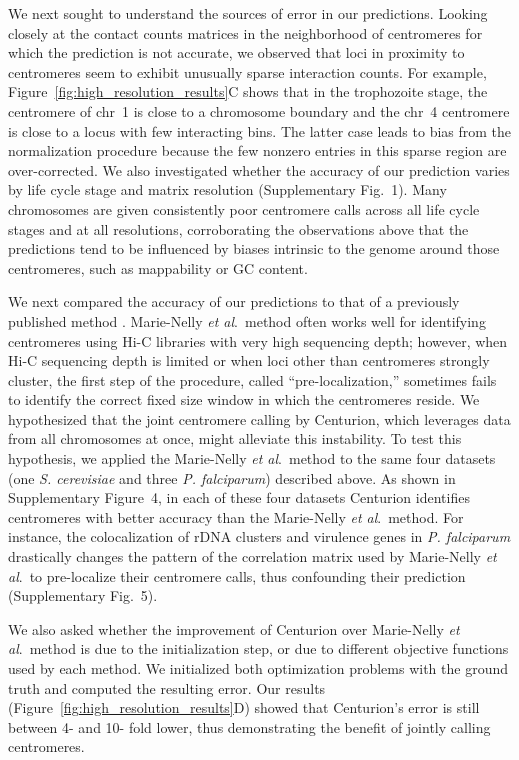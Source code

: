 We next sought to understand the sources of error in our predictions. Looking
closely at the contact counts matrices in the neighborhood of centromeres for
which the prediction is not accurate, we observed that loci in proximity to
centromeres seem to exhibit unusually sparse interaction counts. For example,
Figure~\ref{fig:high_resolution_results}C shows that in the trophozoite stage,
the centromere of chr~1 is close to a chromosome boundary and the chr~4
centromere is close to a locus with few interacting bins. The latter case
leads to bias from the normalization procedure because the few nonzero entries
in this sparse region are over-corrected. We also investigated whether the
accuracy of our prediction varies by life cycle stage and matrix resolution
(Supplementary Fig.~1). Many chromosomes are given
consistently poor centromere calls across all life cycle stages and at all
resolutions, corroborating the observations above that the predictions tend to
be influenced by biases intrinsic to the genome around those centromeres, such
as mappability or GC content.

We next compared the accuracy of our predictions to that of a previously
published method \citep{marie-nelly:filling}. Marie-Nelly
\textit{et al}.\
method often works well for identifying centromeres using Hi-C libraries with
very high sequencing depth; however, when Hi-C sequencing depth is limited or
when loci other than centromeres strongly cluster,
the first step of the procedure, called ``pre-localization,''
sometimes fails to identify the correct fixed size window in which the
centromeres reside.
We hypothesized that
the joint centromere calling by Centurion, which leverages data from all
chromosomes at once, might alleviate this instability. To test this
hypothesis, we applied the Marie-Nelly \textit{et al}.\
method to the same four
datasets (one \textit{S. cerevisiae} and three \textit{P. falciparum})
described above. As shown in Supplementary
Figure~4, in each of these four
datasets Centurion identifies centromeres with better accuracy than the
Marie-Nelly \textit{et al}.\ method.
For instance, the colocalization of rDNA
clusters and virulence genes in \textit{P. falciparum} drastically changes the pattern
of the correlation matrix used by Marie-Nelly
\textit{et al}.\ to pre-localize
their centromere calls, thus confounding their prediction (Supplementary
Fig.~5).

We also asked whether the improvement of Centurion over
Marie-Nelly \textit{et al}.\ method is due to the
initialization step, or
due to different objective functions used by each method. We initialized both
optimization problems with the ground truth and computed the resulting error.
Our results (Figure~\ref{fig:high_resolution_results}D) showed that
Centurion's error is still between 4- and 10- fold lower, thus demonstrating
the benefit of jointly calling centromeres.

